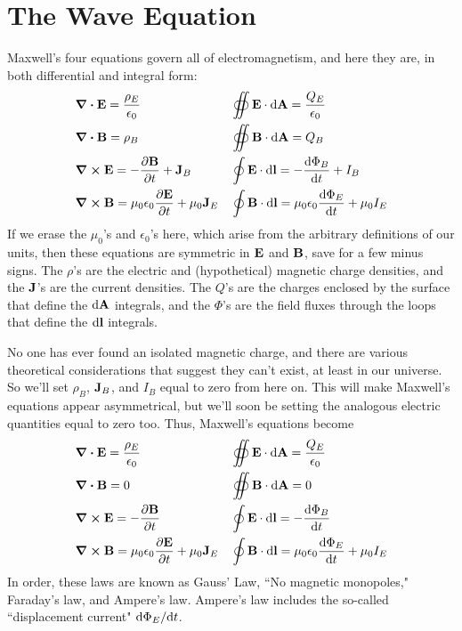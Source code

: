 \section{The Wave Equation}
Maxwell's four equations govern all of electromagnetism, and here they are, in both differential and integral form:
\begin{align*}
    &\div \mathbf{E} = \frac{\rho_E}{\epsilon_0} &&\oiint \mathbf{E} \cdot \dd \mathbf{A} = \frac{Q_E}{\epsilon_0} \\
    &\div \mathbf{B} = \rho_B &&\oiint \mathbf{B} \cdot \dd \mathbf{A} = Q_B \\
    &\curl \mathbf{E} = -\pdv{\mathbf{B}}{t} + \mathbf{J}_B &&\oint \mathbf{E} \cdot \dd\mathbf{l} = -\dv{\Phi_B}{t} + I_B \\
    &\curl \mathbf{B} = \mu_0\epsilon_0 \pdv{\mathbf{E}}{t} + \mu_0\mathbf{J}_E &&\oint \mathbf{B} \cdot \dd \mathbf{l} = \mu_0\epsilon_0 \dv{\Phi_E}{t} + \mu_0 I_E
\end{align*}
If we erase the $\mu_0$'s and $\epsilon_0$'s here, which arise from the arbitrary definitions of our units, then these equations are symmetric in $\mathbf{E}$ and $\mathbf{B}$, save for a few minus signs. The $\rho$'s are the electric and (hypothetical) magnetic charge densities, and the $\mathbf{J}$'s are the current densities. The $Q$'s are the charges enclosed by the surface that define the $\dd \mathbf{A}$ integrals, and the $\Phi$'s are the field fluxes through the loops that define the $\dd\mathbf{l}$ integrals.

No one has ever found an isolated magnetic charge, and there are various theoretical considerations that suggest they can't exist, at least in our universe. So we'll set $\rho_B$, $\mathbf{J}_B$, and $I_B$ equal to zero from here on. This will make Maxwell's equations appear asymmetrical, but we'll soon be setting the analogous electric quantities equal to zero too. Thus, Maxwell's equations become
\begin{align*}
    &\div \mathbf{E} = \frac{\rho_E}{\epsilon_0} &&\oiint \mathbf{E} \cdot \dd \mathbf{A} = \frac{Q_E}{\epsilon_0} \\
    &\div \mathbf{B} = 0 &&\oiint \mathbf{B} \cdot \dd \mathbf{A} = 0 \\
    &\curl \mathbf{E} = -\pdv{\mathbf{B}}{t} &&\oint \mathbf{E} \cdot \dd\mathbf{l} = -\dv{\Phi_B}{t} \\
    &\curl \mathbf{B} = \mu_0\epsilon_0 \pdv{\mathbf{E}}{t} + \mu_0\mathbf{J}_E &&\oint \mathbf{B} \cdot \dd \mathbf{l} = \mu_0\epsilon_0 \dv{\Phi_E}{t} + \mu_0 I_E
\end{align*}
In order, these laws are known as Gauss' Law, ``No magnetic monopoles," Faraday's law, and Ampere's law. Ampere's law includes the so-called ``displacement current" $\dd \Phi_E/\dd t$.

